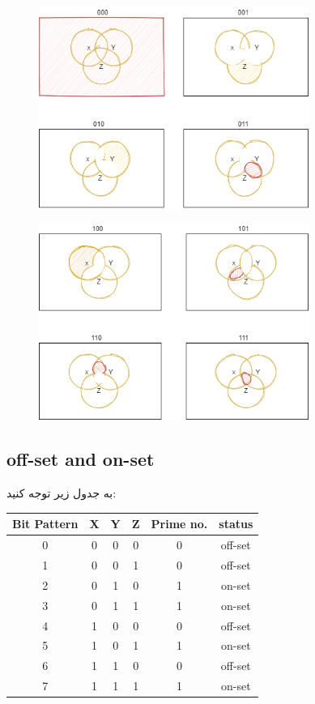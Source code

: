 \documentclass[20pt, a5paper]{article}
\begin{document}
\begin{figure}[htbp]
	\centerline{\includegraphics[width=250pt]{img/venn/solution1.png}}
\end{figure}

\begin{figure}[htbp]
	\centerline{\includegraphics[width=250pt]{img/venn/solution2.png}}
\end{figure}
\newpage

\raggedleft
\justifying
\subsection{off-set and on-set}
به جدول زیر توجه کنید:
\center 
\begin{LTR}
	\begin{tabular}{ c | c c c | c | c }
		Bit Pattern & X & Y & Z & Prime no. & status \\
		\hline
		0 & 0 & 0 & 0 & 0 & off-set \\ 				
		1 & 0 & 0 & 1 & 0 & off-set\\
		2 & 0 & 1 & 0 & 1 & on-set\\
		3 & 0 & 1 & 1 & 1 & on-set\\
		4 & 1 & 0 & 0 & 0 & off-set\\
		5 & 1 & 0 & 1 & 1 & on-set\\
		6 & 1 & 1 & 0 & 0 & off-set\\
		7 & 1 & 1 & 1 & 1 & on-set\\	
	\end{tabular}
\end{LTR}
\hfill \break
\end{document}
